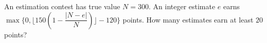 An estimation contest has true value $N=300$. An integer estimate $e$ earns $\max\{0,\lfloor150(1-\dfrac{|N-e|}{N})\rfloor-120\}$ points. How many estimates earn at least $20$ points?
